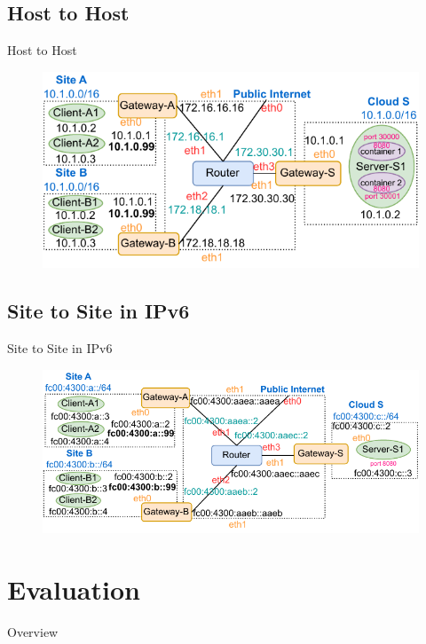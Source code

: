 \documentclass{beamer}
\begin{document}
\subsection{Host to Host}
\begin{frame}{Host to Host}
\begin{figure}[t!]
  \begin{center}
    \includegraphics[scale=1]{figures/host-to-host.pdf}
    \label{fig:host2host}
  \end{center}
\end{figure}
\end{frame}

\subsection{Site to Site in IPv6}
\begin{frame}{Site to Site in IPv6}
\begin{figure}[t!]
  \begin{center}
    \includegraphics[scale=0.95]{figures/ipv6-site-to-site.pdf}
    \label{fig:ipv6site2site}
  \end{center}
\end{figure}
\end{frame}

\section{Evaluation}
\begin{frame}{Overview}
    \tableofcontents[currentsection]
\end{frame}
\end{document}
